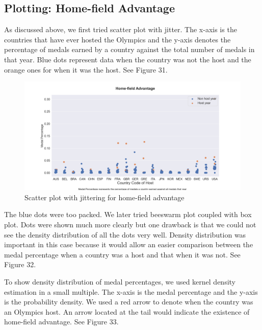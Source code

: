 \documentclass[12pt]{article}
\begin{document}
\subsection{Plotting: Home-field Advantage}
As discussed above, we first tried scatter plot with jitter. The x-axis is the countries that have ever hosted the Olympics and the y-axis denotes the percentage of medals earned by a country against the total number of medals in that year. Blue dots represent data when the country was not the host and the orange ones for when it was the host. See Figure 31.

\begin{figure}[!b]
    \centering
    \includegraphics[scale=0.38]{pics/g-2-7.png}
    \caption{Scatter plot with jittering for home-field advantage}
    \label{fig:my_label}
\end{figure}

The blue dots were too packed. We later tried beeswarm plot coupled with box plot. Dots were shown much more clearly but one drawback is that we could not see the density distribution of all the dots very well. Density distribution was important in this case because it would allow an easier comparison between the medal percentage when a country was a host and that when it was not. See Figure 32. 

To show density distribution of medal percentages, we used kernel density estimation in a small multiple. The x-axis is the medal percentage and the y-axis is the probability density. We used a red arrow to denote when the country was an Olympics host. An arrow located at the tail would indicate the existence of home-field advantage. See Figure 33.
\end{document}
